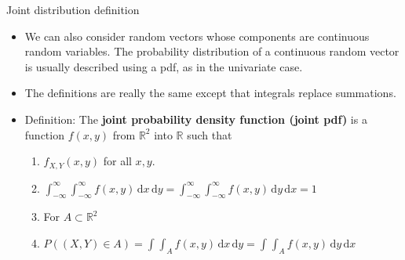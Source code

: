 \documentclass{article}
\newcommand{\integral}[4]{\displaystyle \int_{#1}^{#2} #3 \,\mathrm{d} #4}		%
\begin{document}
Joint distribution definition\bigskip
\begin{itemize}
    \item We can also consider random vectors whose components are continuous random variables. The probability distribution of a continuous random vector is usually described using a pdf, as in the univariate case.
    \item The definitions are really the same except that integrals replace summations.
    \item Definition: The \textbf{joint probability density function (joint pdf)} is a function $f(x,y)$ from $\mathbb{R}^2$ into $\mathbb{R}$ such that
    \begin{enumerate}
        \item $f_{X,Y}(x,y)$ \hspace{30pt} for all $x, y$.
        \item $\integral{-\infty}{\infty}{\integral{-\infty}{\infty}{f(x,y)}{x}}{y} = \integral{-\infty}{\infty}{\integral{-\infty}{\infty}{f(x,y)}{y}}{x} = 1$ \hspace{30pt} \bigskip\\
        \item For $A \subset \mathbb{R}^2$ 
        \item[] $\displaystyle P((X,Y) \in A) = \integral{}{}{\integral{A}{}{f(x,y)}{x}}{y} = \integral{}{}{\integral{A}{}{f(x,y)}{y}}{x}$
    \end{enumerate}\bigskip
\end{itemize}\bigskip
\end{document}
